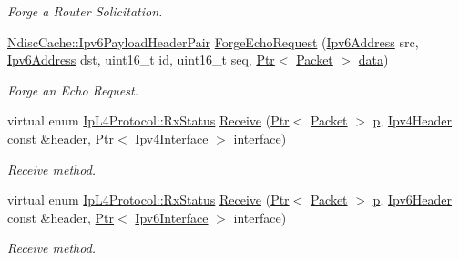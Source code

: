 \begin{DoxyCompactItemize}
\begin{DoxyCompactList}\small\item\em Forge a Router Solicitation. \end{DoxyCompactList}\item 
\hyperlink{classns3_1_1NdiscCache_a29c07f4c9da0e923f442f6440666240e}{Ndisc\+Cache\+::\+Ipv6\+Payload\+Header\+Pair} \hyperlink{classns3_1_1Icmpv6L4Protocol_a2145831e01c5804d4d10d4fa4c5930ba}{Forge\+Echo\+Request} (\hyperlink{classns3_1_1Ipv6Address}{Ipv6\+Address} src, \hyperlink{classns3_1_1Ipv6Address}{Ipv6\+Address} dst, uint16\+\_\+t id, uint16\+\_\+t seq, \hyperlink{classns3_1_1Ptr}{Ptr}$<$ \hyperlink{classns3_1_1Packet}{Packet} $>$ \hyperlink{topology-example-sim_8cc_a26c65296e316af77b787dc77469bb2a4}{data})
\begin{DoxyCompactList}\small\item\em Forge an Echo Request. \end{DoxyCompactList}\item 
virtual enum \hyperlink{classns3_1_1IpL4Protocol_afd3744c89902fff232e2fd45f558c80e}{Ip\+L4\+Protocol\+::\+Rx\+Status} \hyperlink{classns3_1_1Icmpv6L4Protocol_aedf7165666f27e8907a56247f2da9a88}{Receive} (\hyperlink{classns3_1_1Ptr}{Ptr}$<$ \hyperlink{classns3_1_1Packet}{Packet} $>$ \hyperlink{lte__link__budget__x2__handover__measures_8m_ac9de518908a968428863f829398a4e62}{p}, \hyperlink{classns3_1_1Ipv4Header}{Ipv4\+Header} const \&header, \hyperlink{classns3_1_1Ptr}{Ptr}$<$ \hyperlink{classns3_1_1Ipv4Interface}{Ipv4\+Interface} $>$ interface)
\begin{DoxyCompactList}\small\item\em Receive method. \end{DoxyCompactList}\item 
virtual enum \hyperlink{classns3_1_1IpL4Protocol_afd3744c89902fff232e2fd45f558c80e}{Ip\+L4\+Protocol\+::\+Rx\+Status} \hyperlink{classns3_1_1Icmpv6L4Protocol_a31342a8123eab651a5cabd1a197b0145}{Receive} (\hyperlink{classns3_1_1Ptr}{Ptr}$<$ \hyperlink{classns3_1_1Packet}{Packet} $>$ \hyperlink{lte__link__budget__x2__handover__measures_8m_ac9de518908a968428863f829398a4e62}{p}, \hyperlink{classns3_1_1Ipv6Header}{Ipv6\+Header} const \&header, \hyperlink{classns3_1_1Ptr}{Ptr}$<$ \hyperlink{classns3_1_1Ipv6Interface}{Ipv6\+Interface} $>$ interface)
\begin{DoxyCompactList}\small\item\em Receive method. \end{DoxyCompactList}\item 

\end{DoxyCompactItemize}
